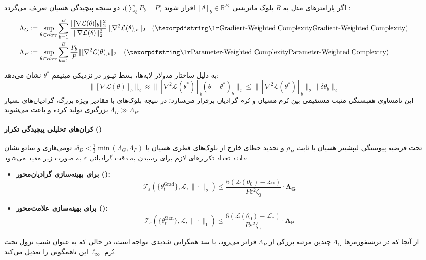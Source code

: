 اگر پارامترهای مدل به $B$ بلوک ماتریسی $[\theta]_b \in \mathbb{R}^{P_b}$ افراز شوند ($\sum_b P_b = P$)، دو سنجه پیچیدگی هسیان تعریف می‌گردد \cite{tomihari2026understanding}:
\begin{align}
    \Lambda_G &:= \sup_{\theta \in \mathcal{R}_{\text{FT}}} \sum_{b=1}^B \frac{\|[ \nabla \mathcal{L}(\theta) ]_b\|_2^2}{\|\nabla \mathcal{L}(\theta)\|_2^2} \|[\nabla^2 \mathcal{L}(\theta)]_b\|_2 \quad \text{(\en{Gradient-Weighted Complexity})} \\
    \Lambda_P &:= \sup_{\theta \in \mathcal{R}_{\text{FT}}} \sum_{b=1}^B \frac{P_b}{P} \|[\nabla^2 \mathcal{L}(\theta)]_b\|_2 \quad \text{(\en{Parameter-Weighted Complexity})}
\end{align}

به دلیل ساختار مدولار لایه‌ها، بسط تیلور در نزدیکی مینیمم $\theta^*$ نشان می‌دهد:
\begin{equation}
    \|[\nabla \mathcal{L}(\theta)]_b\|_2 \approx \|[\nabla^2 \mathcal{L}(\theta^*)]_b (\theta - \theta^*)_b\|_2 \le \|[\nabla^2 \mathcal{L}(\theta^*)]_b\|_2 \|\delta \theta_b\|_2
\end{equation}
این نامساوی همبستگی مثبت مستقیمی بین نُرم هسیان و نُرم گرادیان برقرار می‌سازد؛ در نتیجه بلوک‌های با مقادیر ویژه بزرگ، گرادیان‌های بسیار بزرگتری تولید کرده و باعث می‌شوند $\Lambda_G \gg \Lambda_P$.

\paragraph*{کران‌های تحلیلی پیچیدگی تکرار ()}
تحت فرضیه پیوستگی لیپشیتز هسیان با ثابت $\rho_H$ و تحدید خطای خارج از بلوک‌های قطری هسیان با $\delta_D < \frac{1}{3}\min(\Lambda_G, \Lambda_P)$، تومی‌هاری و ساتو \cite{tomihari2026understanding} نشان دادند تعداد تکرارهای لازم برای رسیدن به دقت گرادیانی $\varepsilon$ به صورت زیر مقید می‌شود:
\begin{itemize}
    \item \textbf{برای بهینه‌سازی گرادیان‌محور ():}
    \begin{equation}
        \mathcal{T}_\varepsilon \left( \{\theta_t^{\text{Grad}}\}, \mathcal{L}, \|\cdot\|_2 \right) \le \frac{6(\mathcal{L}(\theta_0) - \mathcal{L}_*)}{P \varepsilon^2 \zeta_0} \cdot \mathbf{\Lambda_G}
    \end{equation}
    \item \textbf{برای بهینه‌سازی علامت‌محور ():}
    \begin{equation}
        \mathcal{T}_\varepsilon \left( \{\theta_t^{\text{Sign}}\}, \mathcal{L}, \|\cdot\|_1 \right) \le \frac{6(\mathcal{L}(\theta_0) - \mathcal{L}_*)}{P \varepsilon^2 \zeta_0} \cdot \mathbf{\Lambda_P}
    \end{equation}
\end{itemize}
از آنجا که در ترنسفورمرها $\Lambda_G$ چندین مرتبه بزرگی از $\Lambda_P$ فراتر می‌رود،  با سد همگرایی شدیدی مواجه است، در حالی که  به عنوان شیب نزول تحت نُرم $\ell_\infty$ این ناهمگونی را تعدیل می‌کند.

